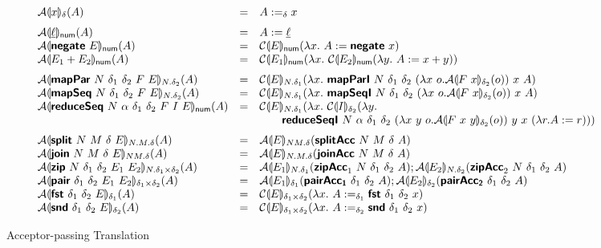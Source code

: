 \begin{figure}
  \begin{displaymath}
    \begin{array}{lcl}
      \semA{x}_\delta(A)
      &=& A :=_\delta x
      \medskip\\

      \semA{\underline{\ell}}_{\num}(A)
      &=& A := \underline{\ell}
      \\
      \semA{\prim{negate}~E}_{\num}(A)
      &=& \semE{E}_{\num}(\lambda x.~A := \prim{negate}~x)
      \\
      \semA{E_1 + E_2}_{\num}(A)
      &=& \semE{E_1}_{\num}(\lambda x.~\semE{E_2}_{\num}(\lambda y.~A := x + y))
      \medskip\\

      \semA{\prim{mapPar}~N~\delta_1~\delta_2~F~E}_{N.\delta_2}(A)
      &=& \semE{E}_{N.\delta_1}(\lambda x.~\prim{mapParI}~N~\delta_1~\delta_2~(\lambda x~o. \semA{F~x}_{\delta_2}(o))~x~A)
      \\
      \semA{\prim{mapSeq}~N~\delta_1~\delta_2~F~E}_{N.\delta_2}(A)
      &=& \semE{E}_{N.\delta_1}(\lambda x.~\prim{mapSeqI}~N~\delta_1~\delta_2~(\lambda x~o. \semA{F~x}_{\delta_2}(o))~x~A)
      \\
      \semA{\prim{reduceSeq}~N~\alpha~\delta_1~\delta_2~F~I~E}_{\mathsf{num}}(A)
      &=& \begin{array}[t]{@{}l}
            \semE{E}_{N.\delta_1}(\lambda x.~\semE{I}_{\delta_2}(\lambda y.\\
            \quad\quad \prim{reduceSeqI}~N~\alpha~\delta_1~\delta_2~(\lambda x~y~o. \semA{F~x~y}_{\delta_2}(o))~y~x~(\lambda r.A := r)))
          \end{array}
      \medskip\\

      \semA{\prim{split}~N~M~\delta~E}_{N.M.\delta}(A)
      &=& \semA{E}_{NM.\delta}(\prim{splitAcc}~N~M~\delta~A)
      \\
      \semA{\prim{join}~N~M~\delta~E}_{NM.\delta}(A)
      &=& \semA{E}_{N.M.\delta}(\prim{joinAcc}~N~M~\delta~A)
      \\
      \semA{\prim{zip}~N~\delta_1~\delta_2~E_1~E_2}_{N.\delta_1\times\delta_2}(A)
      &=& \semA{E_1}_{N.\delta_1}(\prim{zipAcc}_1~N~\delta_1~\delta_2~A);
          \semA{E_2}_{N.\delta_2}(\prim{zipAcc}_2~N~\delta_1~\delta_2~A)
      \\
      \semA{\prim{pair}~\delta_1~\delta_2~E_1~E_2}_{\delta_1\times\delta_2}(A)
      &=& \semA{E_1}_{\delta_1}(\prim{pairAcc_1}~\delta_1~\delta_2~A);
          \semA{E_2}_{\delta_2}(\prim{pairAcc_2}~\delta_1~\delta_2~A)
      \\
      \semA{\prim{fst}~{\delta_1}~{\delta_2}~E}_{\delta_1}(A)
      &=& \semE{E}_{\delta_1\times\delta_2}(\lambda x.~A :=_{\delta_1} \prim{fst}~{\delta_1}~{\delta_2}~x)
      \\
      \semA{\prim{snd}~{\delta_1}~{\delta_2}~E}_{\delta_2}(A)
      &=& \semE{E}_{\delta_1\times\delta_2}(\lambda x.~A :=_{\delta_2} \prim{snd}~{\delta_1}~{\delta_2}~x)
    \end{array}
  \end{displaymath}
  \caption{Acceptor-passing Translation}\label{fig:acc-trans}
\end{figure}

